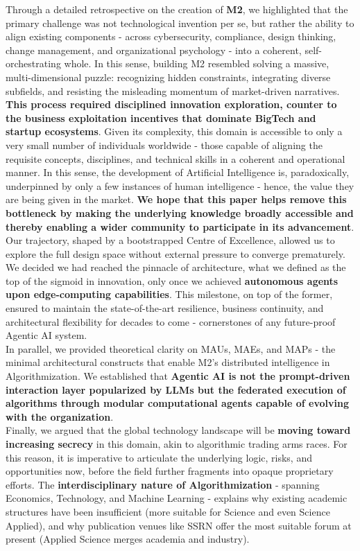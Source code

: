 \documentclass{article}
\begin{document}
Through a detailed retrospective on the creation of \textbf{M2}, we highlighted that the primary challenge was not technological invention per se, but rather the ability to align existing components - across cybersecurity, compliance, design thinking, change management, and organizational psychology - into a coherent, self-orchestrating whole. In this sense, building M2 resembled solving a massive, multi-dimensional puzzle: recognizing hidden constraints, integrating diverse subfields, and resisting the misleading momentum of market-driven narratives. \textbf{This process required disciplined innovation exploration, counter to the business exploitation incentives that dominate BigTech and startup ecosystems}. Given its complexity, this domain is accessible to only a very small number of individuals worldwide - those capable of aligning the requisite concepts, disciplines, and technical skills in a coherent and operational manner. In this sense, the development of Artificial Intelligence is, paradoxically, underpinned by only a few instances of human intelligence - hence, the value they are being given in the market. \textbf{We hope that this paper helps remove this bottleneck by making the underlying knowledge broadly accessible and thereby enabling a wider community to participate in its advancement}.\\

Our trajectory, shaped by a bootstrapped Centre of Excellence, allowed us to explore the full design space without external pressure to converge prematurely. We decided we had reached the pinnacle of architecture, what we defined as the top of the sigmoid in innovation, only once we achieved \textbf{autonomous agents upon edge-computing capabilities}. This milestone, on top of the former, ensured to maintain the state-of-the-art resilience, business continuity, and architectural flexibility for decades to come - cornerstones of any future-proof Agentic AI system.\\

In parallel, we provided theoretical clarity on MAUs, MAEs, and MAPs - the minimal architectural constructs that enable M2's distributed intelligence in Algorithmization. We established that \textbf{Agentic AI is not the prompt-driven interaction layer popularized by LLMs but the federated execution of algorithms through modular computational agents capable of evolving with the organization}.\\

Finally, we argued that the global technology landscape will be \textbf{moving toward increasing secrecy} in this domain, akin to algorithmic trading arms races. For this reason, it is imperative to articulate the underlying logic, risks, and opportunities now, before the field further fragments into opaque proprietary efforts. The \textbf{interdisciplinary nature of Algorithmization} - spanning Economics, Technology, and Machine Learning - explains why existing academic structures have been insufficient (more suitable for Science and even Science Applied), and why publication venues like SSRN offer the most suitable forum at present (Applied Science merges academia and industry).\\
\end{document}
